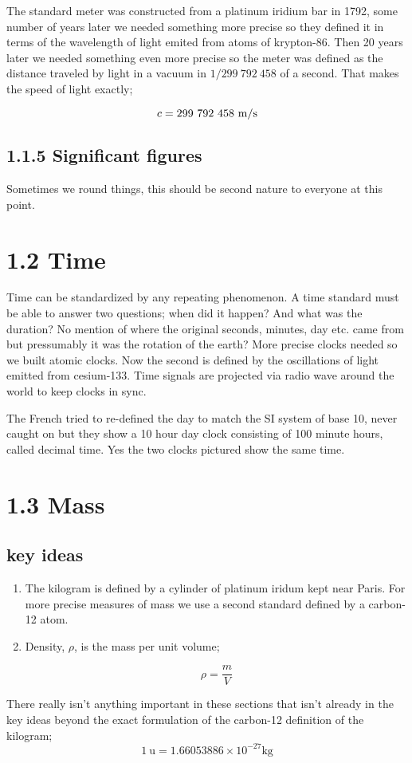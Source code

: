 \documentclass{article}
\begin{document}
The standard meter was constructed from a platinum iridium bar in 1792, some number of years later we needed something more precise so they defined it in terms of the wavelength of light emited from atoms of krypton-86. Then 20 years later we needed something even more precise so the meter was defined as the distance traveled by light in a vacuum in $1/299\ 792\ 458$ of a second. That makes the speed of light exactly;

\[
	c = 299\ 792\ 458\ \unit{{\meter\per\second}}
\]

\subsection*{1.1.5 Significant figures}

Sometimes we round things, this should be second nature to everyone at this point.

\section*{1.2 Time}
Time can be standardized by any repeating phenomenon. A time standard must be able to answer two questions; when did it happen? And what was the duration? No mention of where the original seconds, minutes, day etc. came from but pressumably it was the rotation of the earth? More precise clocks needed so we built atomic clocks. Now the second is defined by the oscillations of light emitted from cesium-133. Time signals are projected via radio wave around the world to keep clocks in sync.

The French tried to re-defined the day to match the SI system of base 10, never caught on but they show a 10 hour day clock consisting of 100 minute hours, called decimal time. Yes the two clocks pictured show the same time.

\section*{1.3 Mass}
\subsection*{key ideas}
\begin{enumerate}
	\item The kilogram is defined by a cylinder of platinum iridum kept near Paris. For more precise measures of mass we use a second standard defined by a carbon-12 atom.
	\item Density, $\rho$, is the mass per unit volume;

		\[
			\rho = \frac{m}{V}
		\]
\end{enumerate}

There really isn't anything important in these sections that isn't already in the key ideas beyond the exact formulation of the carbon-12 definition of the kilogram;
\[
	1\ \text{u} = 1.660 538 86 \times 10^{-27} \unit{\kilo\gram}
\]
\end{document}
